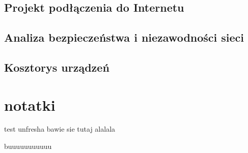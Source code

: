 \documentclass{report}
\begin{document}
\section{Projekt podłączenia do Internetu}
\section{Analiza bezpieczeństwa i niezawodności sieci}
\section{Kosztorys urządzeń}



\chapter*{notatki}
test unfresha bawie sie tutaj 
alalala

buuuuuuuuuuu
\end{document}

